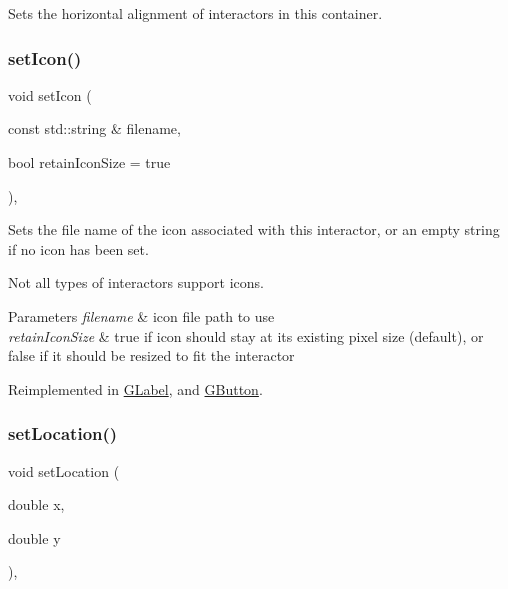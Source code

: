 Sets the horizontal alignment of interactors in this container. 

\mbox{\label{classGInteractor_a762e139aa311461c3984d3ad28293f64}} 
\subsubsection{\texorpdfstring{set\+Icon()}{setIcon()}}
{\footnotesize\ttfamily void set\+Icon (\begin{DoxyParamCaption}\item[{const std\+::string \&}]{filename,  }\item[{bool}]{retain\+Icon\+Size = {\ttfamily true} }\end{DoxyParamCaption})\hspace{0.3cm}{\ttfamily [virtual]}, {\ttfamily [inherited]}}



Sets the file name of the icon associated with this interactor, or an empty string if no icon has been set. 

Not all types of interactors support icons. 
\begin{DoxyParams}{Parameters}
{\em filename} & icon file path to use \\
\hline
{\em retain\+Icon\+Size} & true if icon should stay at its existing pixel size (default), or false if it should be resized to fit the interactor \\
\hline
\end{DoxyParams}


Reimplemented in \mbox{\hyperlink{classGLabel_a75753a3d7d3364185f8088d63b664cb1}{G\+Label}}, and \mbox{\hyperlink{classGButton_a75753a3d7d3364185f8088d63b664cb1}{G\+Button}}.

\mbox{\label{classGInteractor_a04594e8ba9b98513a64f1da00dcae18c}} 
\subsubsection{\texorpdfstring{set\+Location()}{setLocation()}}
{\footnotesize\ttfamily void set\+Location (\begin{DoxyParamCaption}\item[{double}]{x,  }\item[{double}]{y }\end{DoxyParamCaption})\hspace{0.3cm}{\ttfamily [virtual]}, {\ttfamily [inherited]}}



